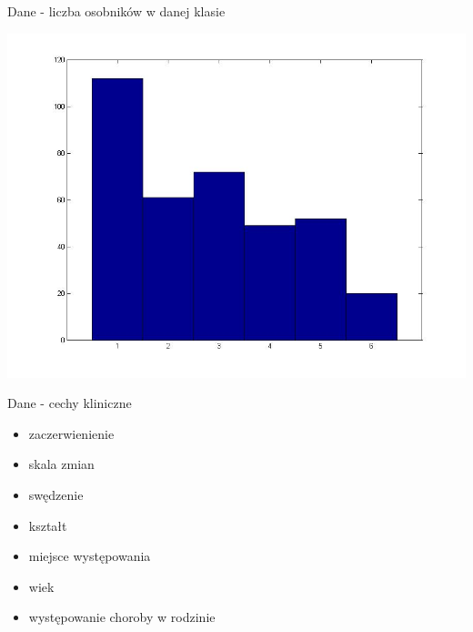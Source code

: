 \documentclass{beamer}
\begin{document}
\begin{frame}{Dane - liczba osobników w danej klasie}

\begin{center}
  \includegraphics[scale=0.35]{img/class_hist.jpg}  
\end{center}

\end{frame}

\begin{frame}{Dane - cechy kliniczne}
  \begin{itemize}
    \item zaczerwienienie
    \item skala zmian
    \item swędzenie
    \item kształt
    \item miejsce występowania
    \item wiek
    \item występowanie choroby w rodzinie
  \end{itemize}
\end{frame}
\end{document}
